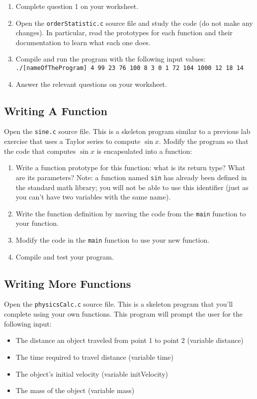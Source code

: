 \documentclass[12pt]{scrartcl}
\begin{document}
\begin{enumerate}
  \item Complete question 1 on your worksheet.
  \item Open the \texttt{orderStatistic.c} source file and
	study the code (do not make any changes).  In particular, read
	the prototypes for each function and their documentation to
	learn what each one does.  
  \item Compile and run the program with the following input values: \\
	\texttt{./[nameOfTheProgram] 4 99 23 76 100 8 3 0 1 72 104 1000 12 18 14}
  \item Answer the relevant questions on your worksheet.
\end{enumerate}

\subsection{Writing A Function}

Open the \texttt{sine.c} source file.  This is a skeleton 
program similar to a previous lab exercise that uses a Taylor series
to compute $\sin{x}$.  Modify the program so that the code that
computes $\sin{x}$ is encapsulated into a function:

\begin{enumerate}
  \item Write a function prototype for this function: what is its return
  	type?  What are its parameters?  Note: a function named \texttt{sin}
	has already been defined in the standard math library; you will
	not be able to use this identifier (just as you can't have two variables
	with the same name).
  \item Write the function definition by moving the code from the \texttt{main}
  	function to your function.
  \item Modify the code in the \texttt{main} function to use your new
  	function.
  \item Compile and test your program.
\end{enumerate}

\subsection{Writing More Functions}

Open the \texttt{physicsCalc.c} source file.  This is a skeleton 
program that you'll complete using your own functions.  This program 
will prompt the user for the following input:
\begin{itemize}
  \item The distance an object traveled from point 1 to point 2 (variable distance)
  \item The time required to travel distance (variable time)
  \item The object's initial velocity (variable initVelocity)
  \item The mass of the object (variable mass)
\end{itemize}
\end{document}
